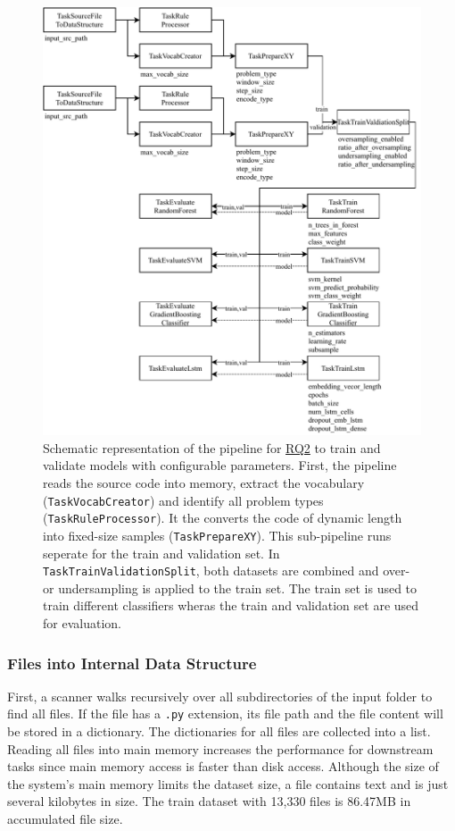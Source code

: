 \begin{figure}
    \includegraphics[width=1\textwidth]{img/ML/Pipeline_RQ2.pdf}
    \caption[Schematic representation of the pipeline to train and validate models.]{Schematic representation of the pipeline for \hyperref[rq:2]{RQ2} to train and validate models with configurable parameters. First, the pipeline reads the source code into memory, extract the vocabulary (\texttt{TaskVocabCreator}) and identify all problem types (\texttt{TaskRuleProcessor}). It the converts the code of dynamic length into fixed-size samples (\texttt{TaskPrepareXY}). This sub-pipeline runs seperate for the train and validation set. In \texttt{TaskTrainValidationSplit}, both datasets are combined and over- or undersampling is applied to the train set. The train set is used to train different classifiers wheras the train and validation set are used for evaluation.}
    \label{fig:pipeline_rq2}
\end{figure}


\subsubsection{Files into Internal Data Structure}
First, a scanner walks recursively over all subdirectories of the input folder to find all files. If the file has a \texttt{.py} extension, its file path and the file content will be stored in a dictionary. The dictionaries for all files are collected into a list. 
Reading all files into main memory increases the performance for downstream tasks since main memory access is faster than disk access. Although the size of the system's main memory limits the dataset size, a file contains text and is just several kilobytes in size. The train dataset with 13,330 files is 86.47MB in accumulated file size.

